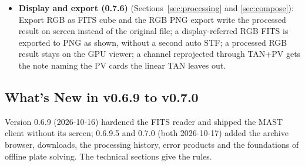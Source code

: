 \documentclass[11pt,a4paper]{article}
\begin{document}
\begin{itemize}[nosep]
\begin{itemize}[nosep]
        \item \textbf{Moments and units}: Spectral moments and their uncertainties are weighted by channel widths, S/N uses the accepted sample population, measured zeros are told apart from legacy Collapse padding, and incompatible ERR units are rejected, keeping mJy apart from MJy. RAMP and RATE are compared on the same finite, DQ-filtered population, with signed differences and their bias, MAE, RMSE and MAD.
        \item \textbf{Validation scope}: Synthetic Br$\gamma$ fixtures compare spectral measurements with an independent SciPy reference; observational Br$\gamma$/JADES validation remains pending, and synthetic validation does not certify real-data PSF matching. The covariance introduced by reprojection and PSF matching is not stored, and SHA-256 checkpoints are not an immutable input snapshot.
        \end{itemize}
    \item \textbf{Display and export (0.7.6)} (Sections~\ref{sec:processing} and \ref{sec:compose}): Export RGB as FITS cube and the RGB PNG export write the processed result on screen instead of the original file; a display-referred RGB FITS is exported to PNG as shown, without a second auto STF; a processed RGB result stays on the GPU viewer; a channel reprojected through TAN+PV gets the note naming the PV cards the linear TAN leaves out.
    \end{itemize}

    \subsection{What's New in v0.6.9 to v0.7.0}
    \label{sec:new_070}

    Version 0.6.9 (2026-10-16) hardened the FITS reader and shipped the MAST client without its screen; 0.6.9.5 and 0.7.0 (both 2026-10-17) added the archive browser, downloads, the processing history, error products and the foundations of offline plate solving. The technical sections give the rules.
\end{document}
